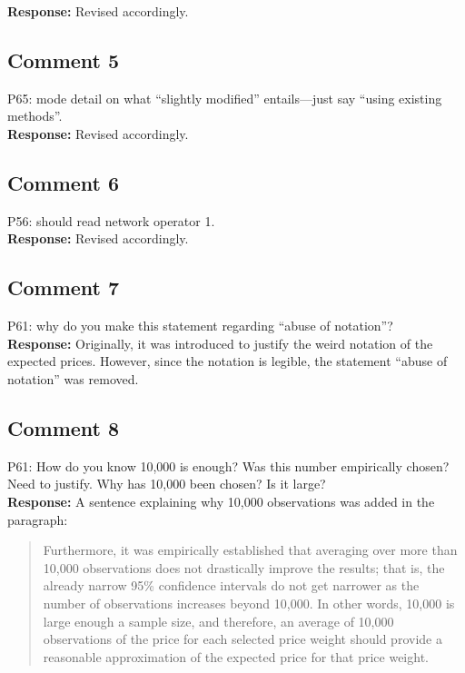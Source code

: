 \documentclass[10pt,a4paper,notitlepage]{article}
\numberwithin{equation}{section}
\begin{document}
\textbf{Response:}
Revised accordingly.

\subsection{Comment 5}
P65: mode detail on what ``slightly modified'' entails---just say ``using existing methods''.\\[-2ex]

\textbf{Response:}
Revised accordingly.

\subsection{Comment 6}
P56: should read network operator 1.\\[-2ex]

\textbf{Response:}
Revised accordingly.

\subsection{Comment 7}
P61: why do you make this statement regarding ``abuse of notation''?\\[-2ex]

\textbf{Response:}
Originally, it was introduced to justify the weird notation of the expected prices. However, since the notation is legible, the statement ``abuse of notation'' was removed.

\subsection{Comment 8}
P61: How do you know 10,000 is enough? Was this number empirically chosen? Need to justify. Why has 10,000 been chosen? Is it large?\\[-2ex]

\textbf{Response:}
A sentence explaining why 10,000 observations was added in the paragraph:
\begin{quote}
Furthermore, it was empirically established that averaging over more than 10,000 observations does not drastically improve the results; that is, the already narrow 95\% confidence intervals do not get narrower as the number of observations increases beyond 10,000. In other words, 10,000 is large enough a sample size, and therefore, an average of 10,000 observations of the price for each selected price weight should provide a reasonable approximation of the expected price for that price weight.
\end{quote}
\end{document}
